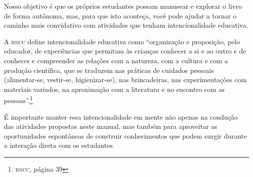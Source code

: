 \documentclass[11pt]{extarticle}
\begin{document}
Nosso objetivo é que os próprios estudantes possam manusear 
e explorar o livro de forma autônoma, mas, para que isto aconteça, você 
pode ajudar a tornar o caminho mais convidativo com atividades que tenham 
intencionalidade educativa. 

A \textsc{bncc} define intencionalidade educativa como ``organização 
e proposição, pelo educador, de experiências que permitam às crianças 
conhecer a si e ao outro e de conhecer e compreender as relações com a 
natureza, com a cultura e com a produção científica, que se traduzem nas 
práticas de cuidados pessoais (alimentar-se, vestir-se, higienizar-se), 
nas brincadeiras, nas experimentações com materiais 
variados, na aproximação com a literatura e no encontro com as 
pessoas''.\footnote{\textsc{bncc}, página 39}

É importante manter essa intencionalidade em mente não apenas na condução 
das atividades propostas neste manual, mas também para aproveitar as 
oportunidades espontâneas de construir conhecimentos que podem surgir durante 
a interação direta com os estudantes.

\end{document}
